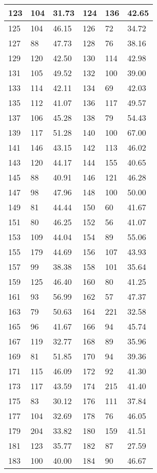 {\begin{longtable}{|p{3cm}|p{3cm}|p{3cm}|p{3cm}|p{3cm}|p{3cm}|}
\hline
123 & 104& 31.73 & 124 & 136& 42.65\\
\hline
125 & 104& 46.15 & 126 & 72& 34.72\\
\hline
127 & 88& 47.73 & 128 & 76& 38.16\\
\hline
129 & 120& 42.50 & 130 & 114& 42.98\\
\hline
131 & 105& 49.52 & 132 & 100& 39.00\\
\hline
133 & 114& 42.11 & 134 & 69& 42.03\\
\hline
135 & 112& 41.07 & 136 & 117& 49.57\\
\hline
137 & 106& 45.28 & 138 & 79& 54.43\\
\hline
139 & 117& 51.28 & 140 & 100& 67.00\\
\hline
141 & 146& 43.15 & 142 & 113& 46.02\\
\hline
143 & 120& 44.17 & 144 & 155& 40.65\\
\hline
145 & 88& 40.91 & 146 & 121& 46.28\\
\hline
147 & 98& 47.96 & 148 & 100& 50.00\\
\hline
149 & 81& 44.44 & 150 & 60& 41.67\\
\hline
151 & 80& 46.25 & 152 & 56& 41.07\\
\hline
153 & 109& 44.04 & 154 & 89& 55.06\\
\hline
155 & 179& 44.69 & 156 & 107& 43.93\\
\hline
157 & 99& 38.38 & 158 & 101& 35.64\\
\hline
159 & 125& 46.40 & 160 & 80& 41.25\\
\hline
161 & 93& 56.99 & 162 & 57& 47.37\\
\hline
163 & 79& 50.63 & 164 & 221& 32.58\\
\hline
165 & 96& 41.67 & 166 & 94& 45.74\\
\hline
167 & 119& 32.77 & 168 & 89& 35.96\\
\hline
169 & 81& 51.85 & 170 & 94& 39.36\\
\hline
171 & 115& 46.09 & 172 & 92& 41.30\\
\hline
173 & 117& 43.59 & 174 & 215& 41.40\\
\hline
175 & 83& 30.12 & 176 & 111& 37.84\\
\hline
177 & 104& 32.69 & 178 & 76& 46.05\\
\hline
179 & 204& 33.82 & 180 & 159& 41.51\\
\hline
181 & 123& 35.77 & 182 & 87& 27.59\\
\hline
183 & 100& 40.00 & 184 & 90& 46.67\\

\end{longtable}}
